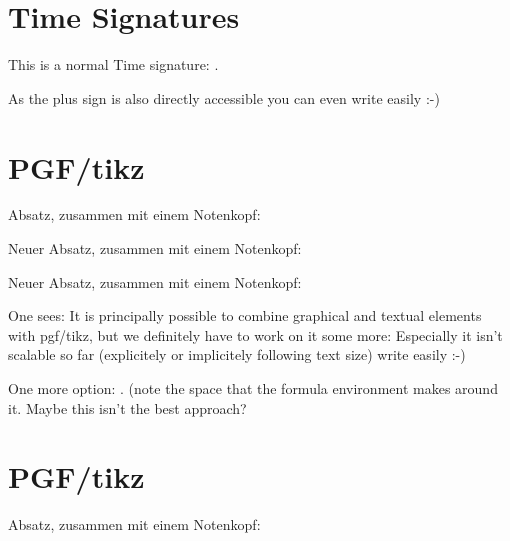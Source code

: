 \documentclass{scrartcl}
\begin{document}
\section*{Time Signatures}
	This is a normal Time signature: .
	
	As the plus sign is also directly accessible you can even
	write  easily :-)

	
\section*{PGF/tikz}

Absatz, zusammen mit einem Notenkopf: 

\Large
Neuer Absatz, zusammen mit einem Notenkopf: 

\normalsize
Neuer Absatz, zusammen mit einem Notenkopf: 

One sees: It is principally possible to combine graphical and textual elements with pgf/tikz,
but we definitely have to work on it some more: Especially it isn't scalable so far (explicitely or implicitely following text size)
	write  easily :-)
	
	One more option:  \lilyText{+} . (note the space that the formula environment makes around it. Maybe this isn't the best approach?

	
\section*{PGF/tikz}

Absatz, zusammen mit einem Notenkopf: 
\end{document}

